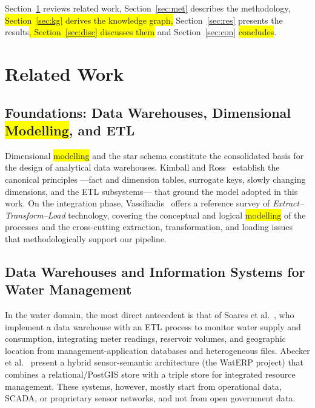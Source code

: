\documentclass[runningheads]{llncs}
\newcommand{\nuevo}[1]{\colorbox{yellow}{#1}}
\renewcommand{\_}{\origunderscore\allowbreak}
\begin{document}
Section~\ref{sec:edo} reviews related work, Section~\ref{sec:met} describes the methodology, \nuevo{Section~\ref{sec:kg} derives the knowledge graph,} Section~\ref{sec:res} presents the results\nuevo{, Section~\ref{sec:disc} discusses them} and Section~\ref{sec:con} \nuevo{concludes}.

\section{Related Work}
\label{sec:edo}

\subsection{Foundations: Data Warehouses, Dimensional \nuevo{Modelling}, and ETL}

Dimensional \nuevo{modelling} and the star schema constitute the consolidated basis for the design of analytical data warehouses. Kimball and Ross~\cite{kimball} establish the canonical principles ---fact and dimension tables, surrogate keys, slowly changing dimensions, and the ETL subsystems--- that ground the model adopted in this work. On the integration phase, Vassiliadis~\cite{vassiliadis2009} offers a reference survey of \emph{Extract--Transform--Load} technology, covering the conceptual and logical \nuevo{modelling} of the processes and the cross-cutting extraction, transformation, and loading issues that methodologically support our pipeline.

\subsection{Data Warehouses and Information Systems for Water Management}

In the water domain, the most direct antecedent is that of Soares et al.~\cite{soares2019}, who implement a data warehouse with an ETL process to monitor water supply and consumption, integrating meter readings, reservoir volumes, and geographic location from management-application databases and heterogeneous files. Abecker et al.~\cite{abecker2014} present a hybrid sensor-semantic architecture (the WatERP project) that combines a relational/PostGIS store with a triple store for integrated resource management. These systems, however, mostly start from operational data, SCADA, or proprietary sensor networks, and not from open government data.
\end{document}
